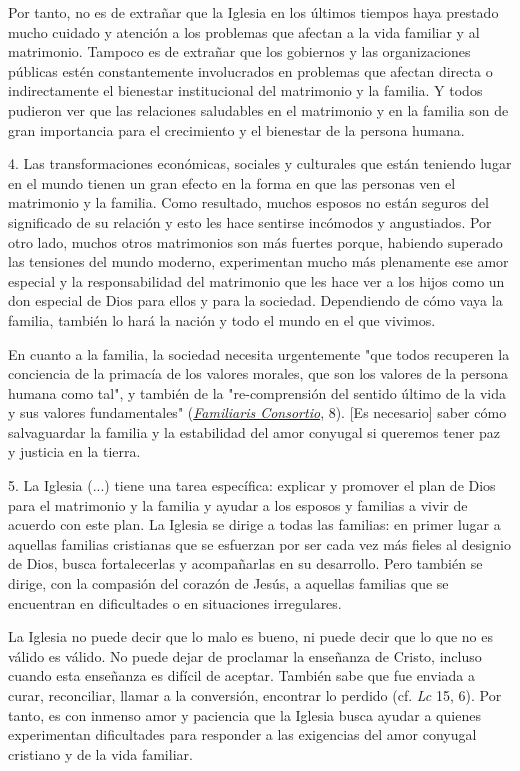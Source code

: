 Por tanto, no es de extrañar que la Iglesia en los últimos tiempos haya
prestado mucho cuidado y atención a los problemas que afectan a la vida
familiar y al matrimonio. Tampoco es de extrañar que los gobiernos y las
organizaciones públicas estén constantemente involucrados en problemas
que afectan directa o indirectamente el bienestar institucional del
matrimonio y la familia. Y todos pudieron ver que las relaciones
saludables en el matrimonio y en la familia son de gran importancia para
el crecimiento y el bienestar de la persona humana.

4. Las transformaciones económicas, sociales y culturales que están
teniendo lugar en el mundo tienen un gran efecto en la forma en que las
personas ven el matrimonio y la familia. Como resultado, muchos esposos
no están seguros del significado de su relación y esto les hace sentirse
incómodos y angustiados. Por otro lado, muchos otros matrimonios son más
fuertes porque, habiendo superado las tensiones del mundo moderno,
experimentan mucho más plenamente ese amor especial y la responsabilidad
del matrimonio que les hace ver a los hijos como un don especial de Dios
para ellos y para la sociedad. Dependiendo de cómo vaya la familia,
también lo hará la nación y todo el mundo en el que vivimos.

En cuanto a la familia, la sociedad necesita urgentemente "que todos
recuperen la conciencia de la primacía de los valores morales, que son
los valores de la persona humana como tal", y también de la
"re-comprensión del sentido último de la vida y sus valores
fundamentales"
(\href{http://www.vatican.va/content/john-paul-ii/it/apost_exhortations/documents/hf_jp-ii_exh_19811122_familiaris-consortio.html}{\emph{\emph{Familiaris
			Consortio}}}, 8). {[}Es necesario{]} saber cómo salvaguardar la familia
y la estabilidad del amor conyugal si queremos tener paz y justicia en
la tierra.

5. La Iglesia (...) tiene una tarea específica: explicar y promover el
plan de Dios para el matrimonio y la familia y ayudar a los esposos y
familias a vivir de acuerdo con este plan. La Iglesia se dirige a todas
las familias: en primer lugar a aquellas familias cristianas que se
esfuerzan por ser cada vez más fieles al designio de Dios, busca
fortalecerlas y acompañarlas en su desarrollo. Pero también se dirige,
con la compasión del corazón de Jesús, a aquellas familias que se
encuentran en dificultades o en situaciones irregulares.

La Iglesia no puede decir que lo malo es bueno, ni puede decir que lo
que no es válido es válido. No puede dejar de proclamar la enseñanza de
Cristo, incluso cuando esta enseñanza es difícil de aceptar. También
sabe que fue enviada a curar, reconciliar, llamar a la conversión,
encontrar lo perdido (cf. \emph{Lc} 15, 6). Por tanto, es con inmenso
amor y paciencia que la Iglesia busca ayudar a quienes experimentan
dificultades para responder a las exigencias del amor conyugal cristiano
y de la vida familiar.


